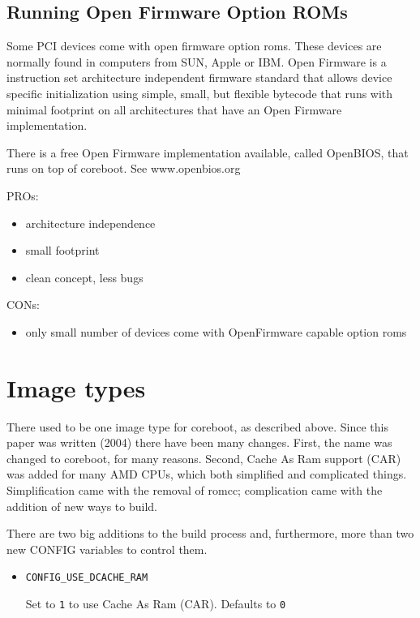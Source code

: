 \documentclass[titlepage,12pt]{article}
\begin{document}
\subsection{Running Open Firmware Option ROMs}

Some PCI devices come with open firmware option roms. These devices are
normally found in computers from SUN, Apple or IBM. Open Firmware is a
instruction set architecture independent firmware standard that allows
device specific initialization using simple, small, but flexible
bytecode that runs with minimal footprint on all architectures that have
an Open Firmware implementation.

There is a free Open Firmware implementation available, called OpenBIOS,
that runs on top of coreboot. See www.openbios.org

PROs:
 \begin{itemize}
 \item architecture independence
 \item small footprint
 \item clean concept, less bugs
 \end{itemize}

CONs:
 \begin{itemize}
 \item only small number of devices come with OpenFirmware capable option roms
 \end{itemize}

%
%

\section{Image types}
There used to be one image type for coreboot, as described above. Since this paper was written (2004) there have been many changes. First, the name
was changed to coreboot, for many reasons. Second, Cache As Ram support (CAR)
was added for many AMD CPUs, which both simplified and complicated things. Simplification came with the removal of romcc; complication came with the addition of new ways to build.

There are two big additions to the build process and, furthermore, more than two new CONFIG variables to control them.

\begin{itemize}
\item \begin{verbatim}CONFIG_USE_DCACHE_RAM\end{verbatim}

Set to \texttt{1} to use Cache As Ram (CAR). Defaults to \texttt{0}

\end{itemize}
\end{document}
